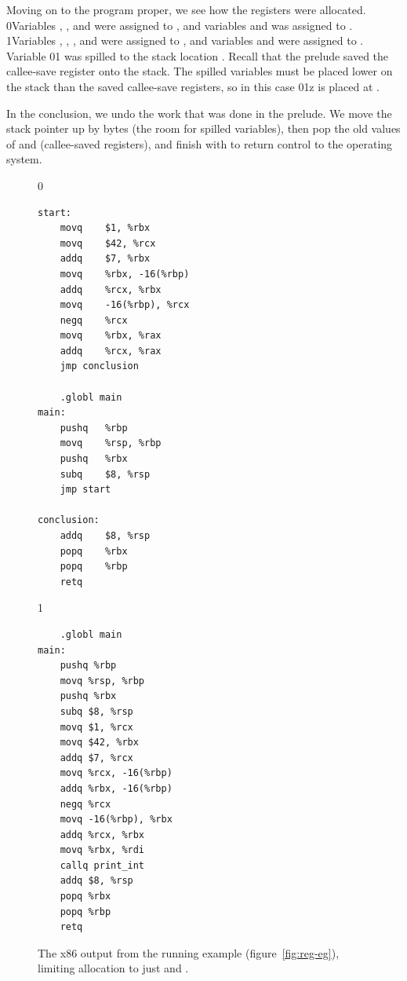 \documentclass[7x10]{TimesAPriori_MIT}%
\def\racketEd{0}
\def\pythonEd{1}
\def\edition{1}
\newcommand{\racket}[1]{{\if\edition\racketEd{#1}\fi}}
\newcommand{\pythonColor}[0]{}
\newcommand{\python}[1]{{\if\edition\pythonEd\pythonColor #1\fi}}
\numberwithin{theorem}{chapter}
\numberwithin{definition}{chapter}
\numberwithin{equation}{chapter}
\begin{document}
Moving on to the program proper, we see how the registers were
allocated.
%
\racket{Variables , , and  were assigned to
  \code{rbx}, and variables  and \code{t} was assigned to .}
%
\python{Variables , , , and \code{tmp\_0}
  were assigned to \code{rcx}, and variables \code{w} and \code{tmp\_1}
  were assigned to \code{rbx}.}
%
Variable \racket{}\python{} was spilled to the stack
location .  Recall that the prelude saved the
callee-save register  onto the stack. The spilled variables
must be placed lower on the stack than the saved callee-save
registers, so in this case \racket{}\python{z} is placed at
.

In the conclusion, we undo the work that was
done in the prelude. We move the stack pointer up by  bytes
(the room for spilled variables), then pop the old values of
 and  (callee-saved registers), and finish with
 to return control to the operating system.

  
\begin{figure}[tbp]
\begin{minipage}{0.55\textwidth}
\begin{tcolorbox}[colback=white]
{\if\edition\racketEd
\begin{lstlisting}
start:
    movq	$1, %rbx
    movq	$42, %rcx
    addq	$7, %rbx
    movq	%rbx, -16(%rbp)
    addq	%rcx, %rbx
    movq	-16(%rbp), %rcx
    negq	%rcx
    movq	%rbx, %rax
    addq	%rcx, %rax
    jmp conclusion

    .globl main
main:
    pushq	%rbp
    movq	%rsp, %rbp
    pushq	%rbx
    subq	$8, %rsp
    jmp start

conclusion:
    addq	$8, %rsp
    popq	%rbx
    popq	%rbp
    retq
\end{lstlisting}
\fi}
{\if\edition\pythonEd\pythonColor
\begin{lstlisting}
    .globl main
main:
    pushq %rbp
    movq %rsp, %rbp
    pushq %rbx
    subq $8, %rsp
    movq $1, %rcx
    movq $42, %rbx
    addq $7, %rcx
    movq %rcx, -16(%rbp)
    addq %rbx, -16(%rbp)
    negq %rcx
    movq -16(%rbp), %rbx
    addq %rcx, %rbx
    movq %rbx, %rdi
    callq print_int
    addq $8, %rsp
    popq %rbx
    popq %rbp
    retq
\end{lstlisting}
\fi}
\end{tcolorbox}
\end{minipage}
\caption{The x86 output from the running example
  (figure~\ref{fig:reg-eg}), limiting allocation to just 
  and .}
\label{fig:running-example-x86}
\end{figure}
\end{document}
